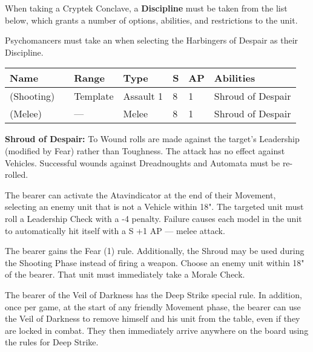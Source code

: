 

When taking a Cryptek Conclave, a \textbf{Discipline} must be taken from the list below, which grants a number of options, abilities, and restrictions to the unit.


Psychomancers must take an  when selecting the Harbingers of Despair as their Discipline.

\label{Abyssal Staff}
\noindent
\begin{tabular}{||m{130pt} m{10pt} m{31pt} m{55pt} m{12pt} m{12pt} m{210pt}||}
	\hline
	Name & & Range & Type & S & AP & Abilities \\
	\hline
	\quickref{Abyssal Staff} (Shooting) & & Template & Assault 1 & 8 & 1 & Shroud of Despair \\
	\quickref{Abyssal Staff} (Melee) & & — & Melee & 8 & 1 & Shroud of Despair \\
	\hline
\end{tabular}

\textbf{Shroud of Despair:} To Wound rolls are made against the target's Leadership (modified by Fear) rather than Toughness. The attack has no effect against Vehicles. Successful wounds against Dreadnoughts and Automata must be re-rolled.


The bearer can activate the Atavindicator at the end of their Movement, selecting an enemy unit that is not a Vehicle within 18". The targeted unit must roll a Leadership Check with a -4 penalty. Failure causes each model in the unit to automatically hit itself with a S +1 AP — melee attack.


The bearer gains the Fear (1) rule. Additionally, the Shroud may be used during the Shooting Phase instead of firing a weapon. Choose an enemy unit within 18" of the bearer. That unit must immediately take a Morale Check.


The bearer of the Veil of Darkness has the Deep Strike special rule. In addition, once per game, at the start of any friendly Movement phase, the bearer can use the Veil of Darkness to remove himself and his unit from the table, even if they are locked in combat. They then immediately arrive anywhere on the board using the rules for Deep Strike.



